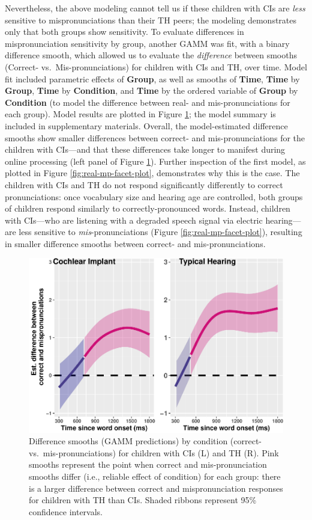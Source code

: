\documentclass[
]{article}
\begin{document}
Nevertheless, the above modeling cannot tell us if these children with CIs are \emph{less} sensitive to mispronunciations than their TH peers; the modeling demonstrates only that both groups show sensitivity. To evaluate differences in mispronunciation sensitivity by group, another GAMM was fit, with a binary difference smooth, which allowed us to evaluate the \emph{difference} between smooths (Correct- vs.~Mis-pronunciations) for children with CIs and TH, over time. Model fit included parametric effects of \textbf{Group}, as well as smooths of \textbf{Time}, \textbf{Time} by \textbf{Group}, \textbf{Time} by \textbf{Condition}, and \textbf{Time} by the ordered variable of \textbf{Group} by \textbf{Condition} (to model the difference between real- and mis-pronunciations for each group). Model results are plotted in Figure \ref{fig:ci-th-facet-plot}; the model summary is included in supplementary materials. Overall, the model-estimated difference smooths show smaller differences between correct- and mis-pronunciations for the children with CIs---and that these differences take longer to manifest during online processing (left panel of Figure \ref{fig:ci-th-facet-plot}). Further inspection of the first model, as plotted in Figure \ref{fig:real-mp-facet-plot}, demonstrates why this is the case. The children with CIs and TH do not respond significantly differently to correct pronunciations: once vocabulary size and hearing age are controlled, both groups of children respond similarly to correctly-pronounced words. Instead, children with CIs---who are listening with a degraded speech signal via electric hearing---are less sensitive to \emph{mis}-pronunciations (Figure \ref{fig:real-mp-facet-plot}), resulting in smaller difference smooths between correct- and mis-pronunciations.

\begin{figure}
\centering
\includegraphics{2_modeling_files/figure-latex/ci-th-facet-plot-1.pdf}
\caption{\label{fig:ci-th-facet-plot}Difference smooths (GAMM predictions) by condition (correct- vs.~mis-pronunciations) for children with CIs (L) and TH (R). Pink smooths represent the point when correct and mis-pronunciation smooths differ (i.e., reliable effect of condition) for each group: there is a larger difference between correct and mispronunciation responses for children with TH than CIs. Shaded ribbons represent 95\% confidence intervals.}
\end{figure}
\end{document}
